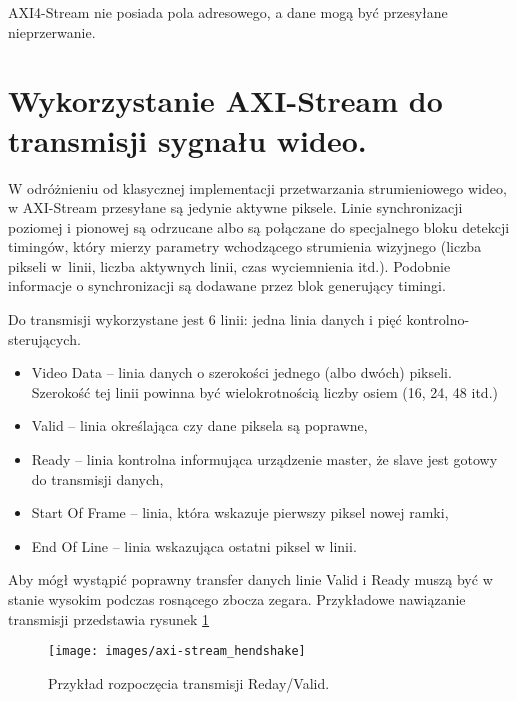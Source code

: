 

AXI4-Stream nie posiada pola adresowego, a dane mogą być przesyłane nieprzerwanie. 

\section{Wykorzystanie AXI-Stream do transmisji sygnału wideo.} 
W odróżnieniu od klasycznej implementacji przetwarzania strumieniowego wideo, w AXI-Stream przesyłane są jedynie aktywne piksele. %
Linie synchronizacji poziomej i pionowej są odrzucane albo są połączane do specjalnego bloku detekcji timingów, który mierzy parametry wchodzącego strumienia wizyjnego (liczba pikseli w~linii, liczba aktywnych linii, czas wyciemnienia itd.). 
Podobnie informacje o synchronizacji są dodawane przez blok generujący timingi.

Do transmisji wykorzystane jest 6 linii: jedna linia danych i pięć kontrolno-sterujących. 
\begin{itemize}

\item Video Data -- linia danych o szerokości jednego (albo dwóch) pikseli. Szerokość tej linii powinna być wielokrotnością liczby osiem (16, 24, 48 itd.)
\item Valid -- linia określająca czy dane piksela są poprawne,
\item Ready -- linia kontrolna informująca urządzenie master, że slave jest gotowy do transmisji danych, %
\item Start Of Frame -- linia, która wskazuje pierwszy piksel nowej ramki,
\item End Of Line -- linia wskazująca ostatni piksel w linii. %

\end{itemize}
Aby mógł wystąpić poprawny transfer danych linie Valid i Ready muszą być w stanie wysokim podczas rosnącego zbocza zegara. 
Przykładowe nawiązanie transmisji przedstawia rysunek \ref{fig:handshake}

\begin{figure}[h]
    \centering
    \texttt{[image: images/axi-stream\_hendshake]}
    \caption{Przykład rozpoczęcia transmisji Reday/Valid.}
    \label{fig:handshake}
\end{figure}

